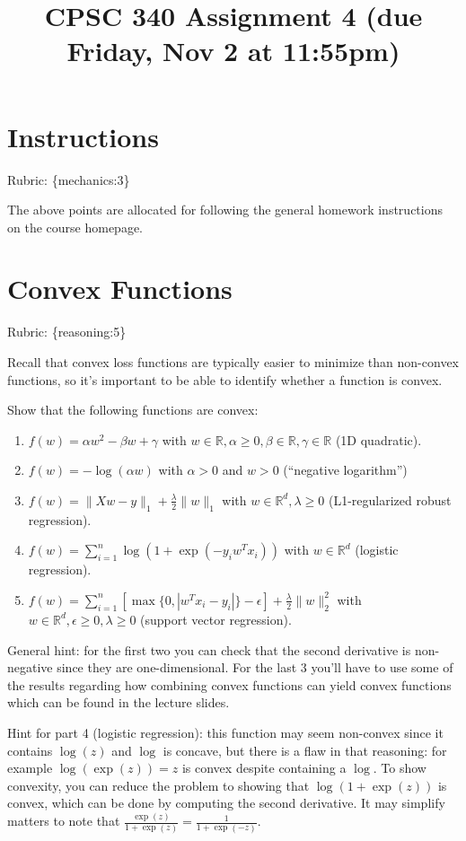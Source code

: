 \documentclass{article}
\def\rubric#1{\gre{Rubric: \{#1\}}}{}
\def\blu#1{{\color{blu}#1}}
\def\gre#1{{\color{gre}#1}}
\def\norm#1{\|#1\|}
\def\R{\mathbb{R}}
\def\enum#1{\begin{enumerate}#1\end{enumerate}}
\begin{document}
\title{CPSC 340 Assignment 4 (due Friday, Nov 2 at 11:55pm)}
\date{}
\maketitle

\vspace{-7em}


\section*{Instructions}
\rubric{mechanics:3}

The above points are allocated for following the general homework instructions on the course homepage.


\section{Convex Functions}
\rubric{reasoning:5}

Recall that convex loss functions are typically easier to minimize than non-convex functions, so it's important to be able to identify whether a function is convex.

\blu{Show that the following functions are convex}:

\enum{
\item $f(w) = \alpha w^2 - \beta w + \gamma$ with $w \in \R, \alpha \geq 0, \beta \in \R, \gamma \in \R$ (1D quadratic).
\item $f(w) = -\log(\alpha w) $ with $\alpha > 0$ and $w > 0$ (``negative logarithm'')
\item $f(w) = \norm{Xw-y}_1 + \frac{\lambda}{2}\norm{w}_1$ with $w \in \R^d, \lambda \geq 0$ (L1-regularized robust regression).
\item $f(w) = \sum_{i=1}^n \log(1+\exp(-y_iw^Tx_i)) $ with $w \in \R^d$ (logistic regression).
\item $f(w) = \sum_{i=1}^n[\max\{0,|w^Tx_i - y_i|\} - \epsilon] + \frac{\lambda}{2}\norm{w}_2^2$  with $w \in \R^d, \epsilon \geq 0, \lambda \geq 0$ (support vector regression).
}

General hint: for the first two you can check that the second derivative is non-negative since they are one-dimensional. For the last 3 you'll have to use some of the results regarding how combining convex functions can yield convex functions which can be found in the lecture slides.

Hint for part 4 (logistic regression): this function may seem non-convex since it contains $\log(z)$ and $\log$ is concave, but there is a flaw in that reasoning: for example $\log(\exp(z))=z$ is convex despite containing a $\log$. To show convexity, you can reduce the problem to showing that $\log(1+\exp(z))$ is convex, which can be done by computing the second derivative. It may simplify matters to note that $\frac{\exp(z)}{1+\exp(z)} = \frac{1}{1+\exp(-z)}$.
\end{document}
